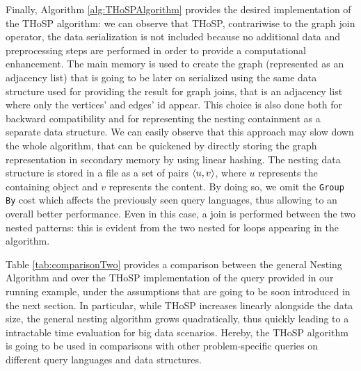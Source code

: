 Finally, Algorithm \vref{alg:THoSPAlgorithm} provides the desired implementation of the THoSP algorithm: we can observe that THoSP, contrariwise to the graph join operator, the data serialization is not included because no additional data and preprocessing steps are performed in order to provide a computational enhancement. The main memory is used to create the graph (represented as an adjacency list) that is going to be later on serialized using the same data structure used for providing the result for graph joins, that is an adjacency list where only the vertices' and edges' id appear. This choice is also done both for backward compatibility and for representing the nesting containment as a separate data structure. We can easily observe that this approach may slow down the whole algorithm, that can be quickened by directly storing the graph representation in secondary memory by using linear hashing. The nesting data structure is stored in a file as a set of pairs $\Braket{u,v}$, where $u$ represents the containing object and $v$ represents the content. By doing so, we omit the \texttt{Group By} cost which affects the previously seen query languages, thus allowing to an overall better performance. Even in this case, a join is performed between the two nested patterns: this is evident from the two nested for loops appearing in the algorithm. 

Table \ref{tab:comparisonTwo} provides a comparison between the general Nesting Algorithm and over the THoSP implementation of the query provided in our running example, under the assumptions that are going to be soon introduced in the next section. In particular, while THoSP increases linearly alongside the data size, the general nesting algorithm grows quadratically, thus quickly leading to a intractable time evaluation for big data scenarios. Hereby, the THoSP algorithm is going to be used in comparisons with other problem-specific queries on different query languages and data structures.
